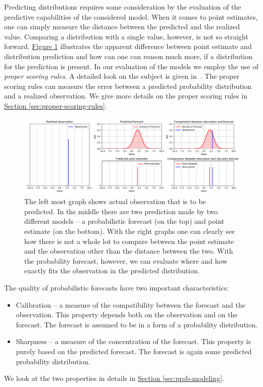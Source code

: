 \documentclass[12pt,a4paper,twoside]{scrartcl}
\numberwithin{equation}{section}
\newcommand{\reffig}[1]{\hyperref[#1]{Figure \ref*{#1}}}
\newcommand{\refsec}[1]{\hyperref[#1]{Section \ref*{#1}}}
\begin{document}
Predicting distributions requires some consideration by the evaluation of the predictive capabilities of the considered model. When it comes to point estimates, one can simply measure the distance between the predicted and the realized value. Comparing a distribution with a single value, however, is not so straight forward. \reffig{fig:point-vs-dist} illustrates the apparent difference between point estimate and distribution prediction and how can one can reason much more, if a distribution for the prediction is present. In our evaluation of the models we employ the use of \emph{proper scoring rules}. A detailed look on the subject is given in~\cite{rafteryg2007}. The proper scoring rules can measure the error between a predicted probability distribution and a realized observation. We give more details on the proper scoring rules in \refsec{sec:proper-scoring-rules}.
\begin{center}
  \begin{figure}[H]
    \centering
    \includegraphics[height=0.5\textwidth, width=1.0\textwidth]{figures/distribution_point.png}
    \caption[Point estimate and distribution forecast]{The left most graph shows actual observation that is to be predicted. In the middle there are two prediction made by two different models -- a probabilistic forecast (on the top) and point estimate (on the bottom). With the right graphs one can clearly see how there is not a whole lot to compare between the point estimate and the observation other than the distance between the two. With the probability forecast, however, we can evaluate where and how exactly fits the observation in the predicted distribution.}\label{fig:point-vs-dist}
  \end{figure}
\end{center}
\vfill

The quality of probabilistic forecasts have two important characteristics:
\begin{itemize}
\item Calibration -- a measure of the compatibility between the forecast and the observation. This property depends both on the observation and on the forecast. The forecast is assumed to be in a form of a probability distribution.
\item Sharpness -- a measure of the concentration of the forecast. This property is purely based on the predicted forecast. The forecast is again some predicted probability distribution.
\end{itemize}
We look at the two properties in details in \refsec{sec:prob-modeling}.
\end{document}
